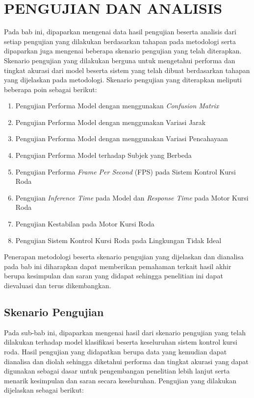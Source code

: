 \chapter{PENGUJIAN DAN ANALISIS}
\label{chap:pengujiananalisis}


Pada bab ini, dipaparkan mengenai data hasil pengujian beserta analisis dari setiap pengujian yang dilakukan berdasarkan tahapan pada metodologi serta dipaparkan juga mengenai beberapa skenario pengujian yang telah diterapkan. Skenario pengujian yang dilakukan berguna untuk mengetahui performa dan tingkat akurasi dari model beserta sistem yang telah dibuat berdasarkan tahapan yang dijelaskan pada metodologi. Skenario pengujian yang diterapkan meliputi beberapa poin sebagai berikut:

\begin{enumerate}[topsep=8pt,itemsep=4pt,partopsep=4pt, parsep=4pt]
  \item Pengujian Performa Model dengan menggunakan \emph{Confusion Matrix}
  \item Pengujian Performa Model dengan menggunakan Variasi Jarak
  \item Pengujian Performa Model dengan menggunakan Variasi Pencahayaan
  \item Pengujian Performa Model terhadap Subjek yang Berbeda
  \item Pengujian Performa \emph{Frame Per Second} (FPS) pada Sistem Kontrol Kursi Roda
  \item Pengujian \emph{Inference Time} pada Model dan \emph{Response Time} pada Motor Kursi Roda
  \item Pengujian Kestabilan pada Motor Kursi Roda
  \item Pengujian Sistem Kontrol Kursi Roda pada Lingkungan Tidak Ideal
\end{enumerate}

Penerapan metodologi beserta skenario pengujian yang dijelaskan dan dianalisa pada bab ini diharapkan dapat memberikan pemahaman terkait hasil akhir berupa kesimpulan dan saran yang didapat sehingga penelitian ini dapat dievaluasi dan terus dikembangkan.

\section{Skenario Pengujian}
\label{sec:skenariopengujian}

Pada sub-bab ini, dipaparkan mengenai hasil dari skenario pengujian yang telah dilakukan terhadap model klasifikasi beserta keseluruhan sistem kontrol kursi roda. Hasil pengujian yang didapatkan berupa data yang kemudian dapat dianalisa dan diolah sehingga diketahui performa dan tingkat akurasi yang dapat digunakan sebagai dasar untuk pengembangan penelitian lebih lanjut serta menarik kesimpulan dan saran secara keseluruhan. Pengujian yang dilakukan dijelaskan sebagai berikut:

